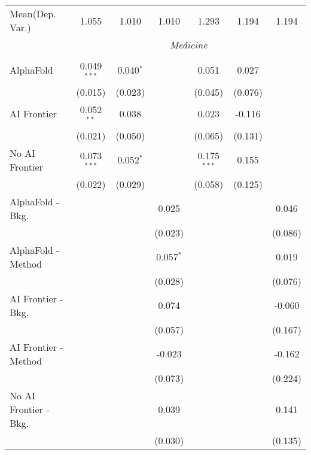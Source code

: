 \begin{tabular}{lcccccc}
Mean(Dep. Var.) & 1.055 & 1.010 & 1.010 & 1.293 & 1.194 & 1.194 \\
 & \multicolumn{6}{c}{\textit{Medicine}} \\ \\
   AlphaFold               & 0.049$^{***}$ & 0.040$^{*}$ &               & 0.051         & 0.027   &   \\   
                           & (0.015)       & (0.023)     &               & (0.045)       & (0.076) &   \\   
   AI Frontier             & 0.052$^{**}$  & 0.038       &               & 0.023         & -0.116  &   \\   
                           & (0.021)       & (0.050)     &               & (0.065)       & (0.131) &   \\   
   No AI Frontier          & 0.073$^{***}$ & 0.052$^{*}$ &               & 0.175$^{***}$ & 0.155   &   \\   
                           & (0.022)       & (0.029)     &               & (0.058)       & (0.125) &   \\   
   AlphaFold - Bkg.        &               &             & 0.025         &               &         & 0.046\\   
                           &               &             & (0.023)       &               &         & (0.086)\\   
   AlphaFold - Method      &               &             & 0.057$^{*}$   &               &         & 0.019\\   
                           &               &             & (0.028)       &               &         & (0.076)\\   
   AI Frontier - Bkg.      &               &             & 0.074         &               &         & -0.060\\   
                           &               &             & (0.057)       &               &         & (0.167)\\   
   AI Frontier - Method    &               &             & -0.023        &               &         & -0.162\\   
                           &               &             & (0.073)       &               &         & (0.224)\\   
   No AI Frontier - Bkg.   &               &             & 0.039         &               &         & 0.141\\   
                           &               &             & (0.030)       &               &         & (0.135)\\   

\end{tabular}
